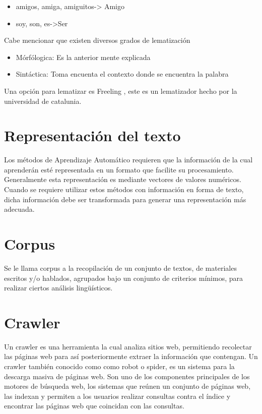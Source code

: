 	\begin{itemize}
		\item amigos, amiga, amiguitos-> Amigo
		\item soy, son, es->Ser
	\end{itemize}

Cabe mencionar que existen diversos grados de lematización

	\begin{itemize}
		\item Mórfólogica: Es la anterior mente explicada
		\item Sintáctica: Toma encuenta el contexto donde se encuentra la palabra

	\end{itemize}

Una opción para lematizar es Freeling \citep{CT18}, este es un lematizador hecho por la
universidad de catalunia.

\section[Representación del t.]{Representación del texto}
Los métodos de Aprendizaje Automático requieren que la información de la cual aprenderán esté representada en un
formato que facilite su procesamiento. Generalmente esta representación es mediante vectores de valores numéricos. 
Cuando se requiere utilizar estos métodos con información en forma de texto, dicha
información debe ser transformada para generar una representación más adecuada. 

\section{Corpus}
Se le llama corpus a la recopilación de un conjunto de textos, de materiales escritos y/o hablados, 
agrupados bajo un conjunto de criterios mínimos, para realizar ciertos análisis lingüísticos.


\section{Crawler}
Un crawler \citep{CT14} es una herramienta la cual analiza sitios web, permitiendo recolectar 
las páginas web para así posteriormente extraer la información que contengan. Un crawler también 
conocido como como robot o spider, es un sistema para la descarga masiva de páginas web. Son uno de 
los componentes principales de los motores de búsqueda web, los sistemas que reúnen un conjunto de 
páginas web, las indexan y permiten a los usuarios realizar consultas contra el índice y encontrar las 
páginas web que coincidan con las consultas.



